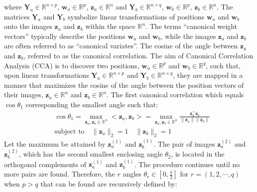 where $\mathbf{Y}_a\in \mathbb{R}^{n\times p}$, ${\mathbf w}_a\in\mathbb{R}^p$, ${\mathbf z}_a\in\mathbb{R}^n$  and $\mathbf{Y}_b\in \mathbb{R}^{n\times q}$, $\mathbf{w}_b\in\mathbb{R}^p$, ${\mathbf z}_b\in\mathbb{R}^n$. The matrices $\mathbf{Y}_a$ and $\mathbf{Y}_b$ symbolize linear transformations of positions ${\mathbf w}_a$ and ${\mathbf w}_b$ onto the images ${\mathbf z}_a$ and ${\mathbf z}_b$ within the space $\mathbb{R}^n$. The terms ``canonical weight vectors'' typically describe the positions ${\mathbf w}_a$ and ${\mathbf w}_b$, while the images ${\mathbf z}_a$ and ${\mathbf z}_b$ are often referred to as ``canonical variates''. The cosine of the angle between ${\mathbf z}_a$ and ${\mathbf z}_b$, referred to as the canonical correlation. The aim of Canonical Correlation Analysis (CCA) is to discover two positions, $\mathbf{w}_a \in \mathbb{R}^p$ and $\mathbf{w}_b \in \mathbb{R}^q$, such that, upon linear transformations $\mathbf{Y}_a \in \mathbb{R}^{n\times p}$ and $\mathbf{Y}_b \in \mathbb{R}^{n\times q}$, they are mapped in a manner that maximizes the cosine of the angle between the position vectors of their images, $\mathbf{z}_a \in \mathbb{R}^n$ and $\mathbf{z}_b \in \mathbb{R}^n$. The first canonical correlation which equals $\cos\theta_1$ corresponding the smallest angle such that:
\begin{equation}
\begin{aligned}
&\cos \theta_1 = \underset{{\mathbf z}_a, {\mathbf z}_b \in\mathbb{R}^n}{\max}<{\mathbf z}_a, {\mathbf z}_b>
			   = \underset{{\mathbf z}_a, {\mathbf z}_b \in\mathbb{R}^n}{\max}
			   		 \frac{\mathbf{z}_a^\top \mathbf{z}_b}{\|\mathbf{z}_a\| \|\mathbf{z}_b\|} \\
&\text{subject to}\quad \|{\mathbf z}_a\|_2=1\quad \|{\mathbf z}_b\|_2=1
\end{aligned}
\end{equation}
Let the maximum be attained by $\mathbf{z}_{a}^{(1)}$ and $\mathbf{z}_{b}^{(1)}$. The pair of images $\mathbf{z}_{a}^{(2)}$ and $\mathbf{z}_{b}^{(2)}$, which has the second smallest enclosing angle $\theta_2$, is located in the orthogonal complements of $\mathbf{z}_{a}^{(1)}$ and $\mathbf{z}_{b}^{(1)}$. The procedure continues until no more pairs are found. Therefore, the $r$ angles $\theta_r \in [0, \frac{\pi}{2}]$ for $r = (1,2,\cdots,q)$ when $p > q$ that can be found are recursively defined by:

